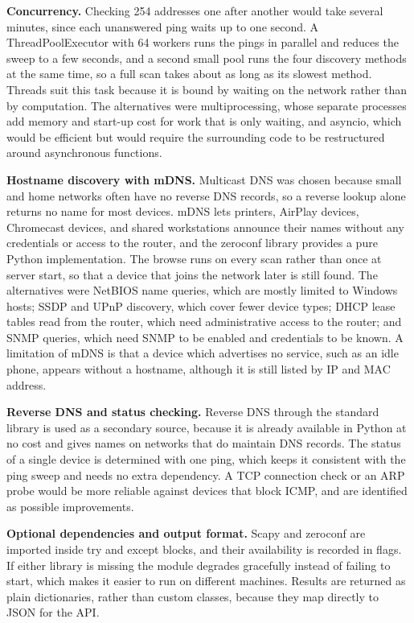 \textbf{Concurrency.} Checking 254 addresses one after another would take
several minutes, since each unanswered ping waits up to one second. A
ThreadPoolExecutor with 64 workers runs the pings in parallel and reduces the
sweep to a few seconds, and a second small pool runs the four discovery
methods at the same time, so a full scan takes about as long as its slowest
method. Threads suit this task because it is bound by waiting on the network
rather than by computation. The alternatives were multiprocessing, whose
separate processes add memory and start-up cost for work that is only
waiting, and asyncio, which would be efficient but would require the
surrounding code to be restructured around asynchronous functions.

\textbf{Hostname discovery with mDNS.} Multicast DNS was chosen because small
and home networks often have no reverse DNS records, so a reverse lookup
alone returns no name for most devices. mDNS lets printers, AirPlay devices,
Chromecast devices, and shared workstations announce their names without any
credentials or access to the router, and the zeroconf library provides a pure
Python implementation. The browse runs on every scan rather than once at
server start, so that a device that joins the network later is still found.
The alternatives were NetBIOS name queries, which are mostly limited to
Windows hosts; SSDP and UPnP discovery, which cover fewer device types; DHCP
lease tables read from the router, which need administrative access to the
router; and SNMP queries, which need SNMP to be enabled and credentials to be
known. A limitation of mDNS is that a device which advertises no service, such
as an idle phone, appears without a hostname, although it is still listed by
IP and MAC address.

\textbf{Reverse DNS and status checking.} Reverse DNS through the standard
library is used as a secondary source, because it is already available in
Python at no cost and gives names on networks that do maintain DNS records.
The status of a single device is determined with one ping, which keeps it
consistent with the ping sweep and needs no extra dependency. A TCP
connection check or an ARP probe would be more reliable against devices that
block ICMP, and are identified as possible improvements.

\textbf{Optional dependencies and output format.} Scapy and zeroconf are
imported inside try and except blocks, and their availability is recorded in
flags. If either library is missing the module degrades gracefully instead of
failing to start, which makes it easier to run on different machines. Results
are returned as plain dictionaries, rather than custom classes, because they
map directly to JSON for the API.

